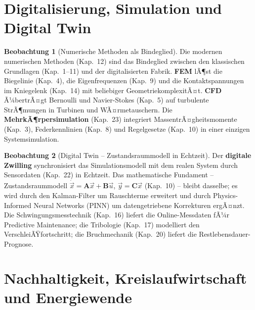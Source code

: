 ﻿\documentclass[a4paper,12pt]{report}
\theoremstyle{definition}
\newtheorem{beobachtung}{Beobachtung}
\begin{document}
\section{Digitalisierung, Simulation und Digital Twin}

\begin{beobachtung}[Numerische Methoden als Bindeglied]
Die modernen numerischen Methoden (Kap.~12) sind das Bindeglied zwischen
den klassischen Grundlagen (Kap.~1--11) und der digitalisierten Fabrik.
\textbf{FEM} lÃ¶st die Biegelinie (Kap.~4), die Eigenfrequenzen (Kap.~9)
und die Kontaktspannungen im Kniegelenk (Kap.~14) mit beliebiger
GeometriekomplexitÃ¤t. \textbf{CFD} Ã¼bertrÃ¤gt Bernoulli und Navier-Stokes (Kap.~5)
auf turbulente StrÃ¶mungen in Turbinen und WÃ¤rmetauschern. Die
\textbf{MehrkÃ¶rpersimulation} (Kap.~23) integriert MassentrÃ¤gheitsmomente
(Kap.~3), Federkennlinien (Kap.~8) und Regelgesetze (Kap.~10)
in einer einzigen Systemsimulation.
\end{beobachtung}

\begin{beobachtung}[Digital Twin -- Zustandsraummodell in Echtzeit]
Der \textbf{digitale Zwilling} synchronisiert das Simulationsmodell
mit dem realen System durch Sensordaten (Kap.~22) in Echtzeit.
Das mathematische Fundament -- Zustandsraummodell
$\dot{\vec{x}} = \mathbf{A}\vec{x} + \mathbf{B}\vec{u}$,
$\vec{y} = \mathbf{C}\vec{x}$ (Kap.~10) -- bleibt dasselbe;
es wird durch den Kalman-Filter um Rauschterme erweitert
und durch Physics-Informed Neural Networks (PINN) um
datengetriebene Korrekturen ergÃ¤nzt. Die Schwingungsmesstechnik (Kap.~16)
liefert die Online-Messdaten fÃ¼r Predictive Maintenance;
die Tribologie (Kap.~17) modelliert den VerschleiÃŸfortschritt;
die Bruchmechanik (Kap.~20) liefert die Restlebensdauer-Prognose.
\end{beobachtung}

\section{Nachhaltigkeit, Kreislaufwirtschaft und Energiewende}
\end{document}

